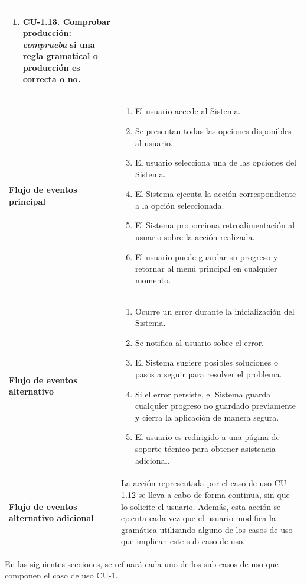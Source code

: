 \begin{longtable}[H]{|>{\columncolor[rgb]{0.63,0.79,0.95}}p{6cm} | p{8.5cm} |}
\begin{enumerate}
        \item \textbf{CU-1.13. Comprobar producción}: \textit{comprueba} si una regla gramatical o producción es correcta o no.
    \end{enumerate} \\
    \hline
    \textbf{Flujo de eventos principal} & 
    \begin{enumerate}
        \item El usuario accede al Sistema.
        \item Se presentan todas las opciones disponibles al usuario.
        \item El usuario selecciona una de las opciones del Sistema.
        \item El Sistema ejecuta la acción correspondiente a la opción seleccionada.
        \item El Sistema proporciona retroalimentación al usuario sobre la acción realizada.
        \item El usuario puede guardar su progreso y retornar al menú principal en cualquier momento.
    \end{enumerate} \\
    \hline
    \textbf{Flujo de eventos alternativo} & 
    \begin{enumerate}
        \item Ocurre un error durante la inicialización del Sistema.
        \item Se notifica al usuario sobre el error.
        \item El Sistema sugiere posibles soluciones o pasos a seguir para resolver el problema.
        \item Si el error persiste, el Sistema guarda cualquier progreso no guardado previamente y cierra la aplicación de manera segura.
        \item El usuario es redirigido a una página de soporte técnico para obtener asistencia adicional.
    \end{enumerate} \\
    \hline
    \textbf{Flujo de eventos alternativo adicional} & La acción representada por el caso de uso CU-1.12 se lleva a cabo de forma continua, sin que lo solicite el usuario. Además, esta acción se ejecuta cada vez que el usuario modifica la gramática utilizando alguno de los casos de uso que implican este sub-caso de uso. \\
    \hline
\end{longtable}


 En las siguientes secciones, se refinará cada uno de los sub-casos de uso que componen el caso de uso CU-1.

